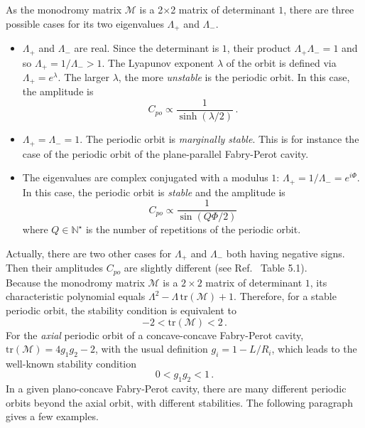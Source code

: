 \documentclass[10pt]{iopart}
\begin{document}
As the monodromy matrix $\mathcal{M}$ is a 2$\times$2 matrix of determinant $1$, there are three possible cases for its two eigenvalues $\Lambda_+$ and $\Lambda_-$.
\begin{itemize}
\item $\Lambda_+$ and $\Lambda_-$ are real. Since the determinant is $1$, their product $\Lambda_+ \Lambda_- = 1$ and so $\Lambda_+ = 1/\Lambda_- > 1$. The Lyapunov exponent $\lambda$ of the orbit is defined via $\Lambda_+ = e^{\lambda}$. The larger $\lambda$, the more \emph{unstable} is the periodic orbit. In this case, the amplitude is
\begin{equation}\label{eq:cp-instable}
    C_{po} \propto \frac{1}{\sinh(\lambda / 2)} \, .
\end{equation}
\item $\Lambda_+=\Lambda_-=1$. The periodic orbit is \emph{marginally stable}. This is for instance the case of the periodic orbit of the plane-parallel Fabry-Perot cavity.
\item The eigenvalues are complex conjugated with a modulus $1$: $\Lambda_+ = 1 / \Lambda_- = e^{i \Phi}$. In this case, the periodic orbit is \emph{stable} and the amplitude is
\begin{equation}\label{eq:cp-stable}
    C_{po} \propto \frac{1}{\sin(Q \Phi / 2)}
\end{equation}
where $Q \in \mathbb{N}^{\star}$ is the number of repetitions of the periodic orbit.
\end{itemize}
Actually, there are two other cases for $\Lambda_+$ and $\Lambda_-$ both having negative signs. Then their amplitudes $C_{po}$ are slightly different (see Ref.~\cite{brack} Table 5.1).\\


Because the monodromy matrix $\mathcal{M}$ is a $ 2 \times 2$ matrix of determinant $1$, its characteristic polynomial equals $\Lambda^2-\Lambda \,\textrm{tr}(\mathcal{M}) + 1$. Therefore, for a stable periodic orbit, the stability condition is equivalent to
\begin{equation} -2 < \textrm{tr}(\mathcal{M}) < 2 \, . \end{equation}
For the \emph{axial} periodic orbit of a concave-concave Fabry-Perot cavity, $\textrm{tr}(\mathcal{M}) = 4 g_1 g_2 - 2$, with the usual definition $g_i = 1 - L / R_i$, which leads to the well-known stability condition
\begin{equation} \label{eq:stabilite-axial}
 0 < g_1 g_2 < 1 \, .
\end{equation}
In a given plano-concave Fabry-Perot cavity, there are many different periodic orbits beyond the axial orbit, with different stabilities. The following paragraph gives a few examples.
\end{document}
